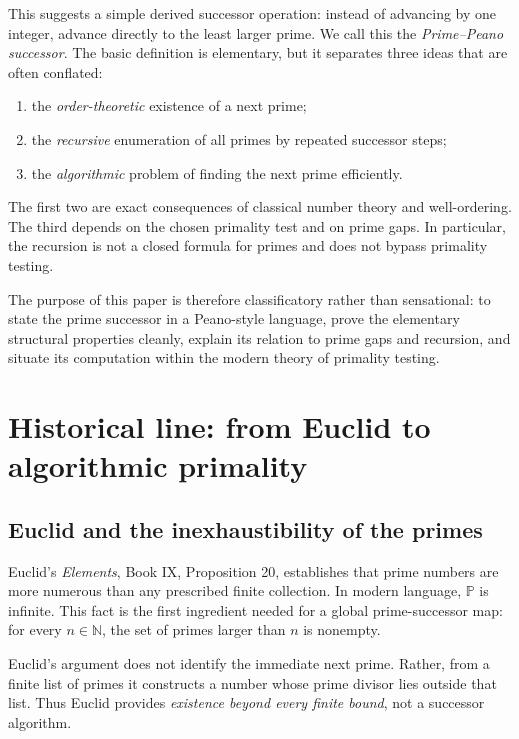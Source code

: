 \documentclass[11pt]{article}
\theoremstyle{definition}
\newcommand{\N}{\mathbb{N}}
\newcommand{\Pp}{\mathbb{P}}
\begin{document}
This suggests a simple derived successor operation: instead of advancing by one integer, advance directly to the least larger prime. We call this the \emph{Prime--Peano successor}. The basic definition is elementary, but it separates three ideas that are often conflated:
\begin{enumerate}[label=(\roman*)]
\item the \emph{order-theoretic} existence of a next prime;
\item the \emph{recursive} enumeration of all primes by repeated successor steps;
\item the \emph{algorithmic} problem of finding the next prime efficiently.
\end{enumerate}

The first two are exact consequences of classical number theory and well-ordering. The third depends on the chosen primality test and on prime gaps. In particular, the recursion is not a closed formula for primes and does not bypass primality testing.

The purpose of this paper is therefore classificatory rather than sensational: to state the prime successor in a Peano-style language, prove the elementary structural properties cleanly, explain its relation to prime gaps and recursion, and situate its computation within the modern theory of primality testing.

\section{Historical line: from Euclid to algorithmic primality}

\subsection{Euclid and the inexhaustibility of the primes}

Euclid's \emph{Elements}, Book IX, Proposition 20, establishes that prime numbers are more numerous than any prescribed finite collection. In modern language, $\Pp$ is infinite. This fact is the first ingredient needed for a global prime-successor map: for every $n\in\N$, the set of primes larger than $n$ is nonempty.

Euclid's argument does not identify the immediate next prime. Rather, from a finite list of primes it constructs a number whose prime divisor lies outside that list. Thus Euclid provides \emph{existence beyond every finite bound}, not a successor algorithm.
\end{document}
